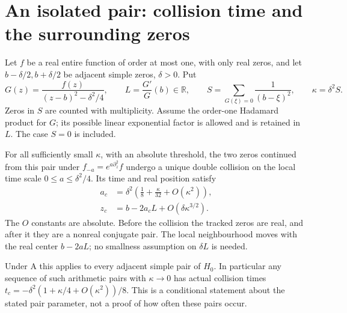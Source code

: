 \section{An isolated pair: collision time and the surrounding zeros}
\label{sec:analytic-isolated-collision}

\begin{theorem}
Let $f$ be a real entire function of order at most one, with
only real zeros, and let $b-\delta/2,b+\delta/2$ be adjacent
simple zeros, $\delta>0$. Put
\[
 G(z)=\frac{f(z)}{(z-b)^2-\delta^2/4},\qquad
 L=\frac{G'}G(b)\in\mathbb R,\qquad
 S=\sum_{G(\xi)=0}\frac1{(b-\xi)^2},\qquad
                       \kappa=\delta^2S.
\]
Zeros in $S$ are counted with multiplicity. Assume the
order-one Hadamard product for $G$; its possible linear
exponential factor is allowed and is retained in $L$.
The case $S=0$ is included.

For all sufficiently small $\kappa$, with an absolute
threshold, the two zeros continued from this pair under
$f_{-a}=e^{a\partial_z^2}f$ undergo a unique double collision
on the local time scale $0\le a\le\delta^2/4$. Its time and
real position satisfy
\begin{align}
 a_c&=\delta^2\left(\frac18+\frac{\kappa}{32}
                                      +O(\kappa^2)\right),
                        \label{eq:analytic-isolated-time}\\
 z_c&=b-2a_cL+O(\delta\kappa^{3/2}).
                        \label{eq:analytic-isolated-center}
\end{align}
The $O$ constants are absolute. Before the collision the
tracked zeros are real, and after it they are a nonreal
conjugate pair. The local neighbourhood moves with the real
center $b-2aL$; no smallness assumption on $\delta L$ is needed.

Under A this applies to every adjacent simple pair of $H_0$.
In particular any sequence of such arithmetic pairs with
$\kappa\to0$ has actual collision times
$t_c=-\delta^2(1+\kappa/4+O(\kappa^2))/8$.
This is a conditional statement about the stated pair
parameter, not a proof of how often these pairs occur.
\end{theorem}

